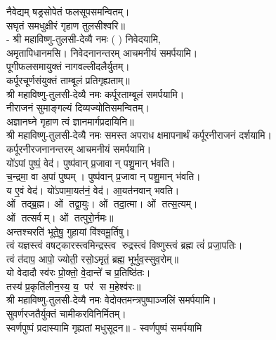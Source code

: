नैवेद्यम् षड्रसोपेतं फलसूपसमन्वितम्।\\
सघृतं समधुक्षीरं गृहाण तुलसीश्वरि॥\\
- श्री महाविष्णु-तुलसी-देव्यै नमः (	) निवेदयामि, \\
अमृतापिधानमसि। निवेदनानन्तरम् आचमनीयं समर्पयामि।\\

पूगीफलसमायुक्तं नागवल्लीदलैर्युतम्।\\
कर्पूरचूर्णसंयुक्तं ताम्बूलं प्रतिगृह्यताम्॥\\
श्री महाविष्णु-तुलसी-देव्यै नमः कर्पूरताम्बूलं समर्पयामि।\\

नीराजनं सुमाङ्गल्यं दिव्यज्योतिसमन्वितम्।\\
अज्ञानघ्ने गृहाण त्वं ज्ञानमार्गप्रदायिनि॥\\
श्री महाविष्णु-तुलसी-देव्यै नमः समस्त अपराध क्षमापनार्थं कर्पूरनीराजनं दर्शयामि।\\
कर्पूरनीरजनानन्तरम् आचमनीयं समर्पयामि।\\

यो॑ऽपां पुष्पं॒ वेद॑। पुष्प॑वान् प्र॒जावान् पशु॒मान् भ॑वति।\\
च॒न्द्रमा॒ वा अ॒पां पुष्पम्। पुष्प॑वान् प्र॒जावान् पशु॒मान् भ॑वति।\\
य ए॒वं वेद॑। यो॑ऽपामा॒यत॑नं॒ वेद॑। आ॒यत॑नवान् भवति।\\

ओं तद्ब्र॒ह्म। ओं तद्वा॒युः। ओं तदा॒त्मा। ओं तत्स॒त्यम्‌।\\
ओं तत्सर्वम्‌। ओं तत्पुरो॒र्नमः॥\\

अन्तश्चरति॑ भूते॒षु॒ गुहायां वि॑श्वमू॒र्तिषु। \\
त्वं यज्ञस्त्वं वषट्कारस्त्वमिन्द्रस्त्व रुद्रस्त्वं विष्णुस्त्वं ब्रह्म त्वं॑ प्रजा॒पतिः। \\
त्वं त॑दाप॒ आपो॒ ज्योती॒ रसो॒ऽमृतं॒ ब्रह्म॒ भूर्भुव॒स्सुव॒रोम्‌॥\\

यो वेदादौ स्व॑रः प्रो॒क्तो॒ वे॒दान्ते॑ च प्र॒तिष्ठि॑तः।\\
तस्य॑ प्र॒कृति॑लीन॒स्य॒ य॒ पर॑ स म॒हेश्व॑रः॥\\

श्री महाविष्णु-तुलसी-देव्यै नमः वेदोक्तमन्त्रपुष्पाञ्जलिं समर्पयामि।\\

सुवर्णरजतैर्युक्तं चामीकरविनिर्मितम्।\\
स्वर्णपुष्पं प्रदास्यामि गृह्यतां मधुसूदन॥ - स्वर्णपुष्पं समर्पयामि\\

